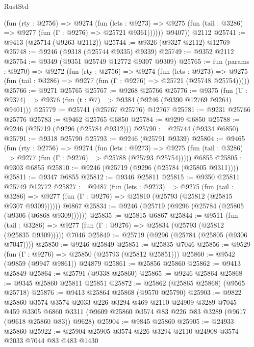 \begin{lexlean}{RustStd}
\begin{coremodule}
            (fun (rty : @2756) =>
            @9274
              (fun (lets : @9273) =>
              @9275 (fun (tail : @3286) => @9277 (fun (Γ : @9276) => @25721 @9361))))))
        @9407))
    @2112
@25741 := @9413 (@25714 (@9263 @2112))
@25744 := @9326 (@9327 @2112) @12769
@25748 := @9246 (@9318 (@25744 @9335) @9339)
@25749 := @9352 @2112
@25754 := @9349 (@9351 @25749 @12772 @9307 @9309)
@25765 := fun (params : @9270) =>
  @9272
    (fun (rty : @2756) =>
    @9274
      (fun (lets : @9273) =>
      @9275 (fun (tail : @3286) => @9277 (fun (Γ : @9276) => @25721 (@25748 @25754)))))
@25766 := @9271 @25765
@25767 := @9268 @25766
@25776 := @9375
    (fun (U : @9374) => @9376 (fun (t : @7) => @9384 (@9246 (@9390 @12769 @9264) @9401)))
@25779 := @25741 (@25767 @25776) @12767
@25781 := @9231 @25766 @25776
@25783 := @9462 @25765 @6850
@25784 := @9299 @6850
@25788 := @9246 (@25719 (@9296 (@25784 @9312)))
@25790 := @25744 (@9334 @6850)
@25791 := @9318 @25790
@25793 := @9246 (@25791 @9339)
@25804 := @9465
    (fun (rty : @2756) =>
    @9274
      (fun (lets : @9273) =>
      @9275 (fun (tail : @3286) => @9277 (fun (Γ : @9276) => @25788 (@25793 @25754)))))
    @6855
@25805 := @9303 @6855
@25810 := @9246 (@25719 (@9296 (@25784 (@25805 @9311))))
@25811 := @9347 @6855
@25812 := @9346 @25811
@25815 := @9350 @25811 @25749 @12772
@25827 := @9487
    (fun (lets : @9273) =>
    @9275
      (fun (tail : @3286) =>
      @9277 (fun (Γ : @9276) => @25810 (@25793 (@25812 (@25815 @9307 @9309))))))
    @6867
@25834 := @9246 (@25719 (@9296 (@25784 (@25805 (@9306 (@6868 @9309))))))
@25835 := @25815 @6867
@25844 := @9511
    (fun (tail : @3286) => @9277 (fun (Γ : @9276) => @25834 (@25793 (@25812 (@25835 @9309)))))
    @7046
@25849 := @25719 (@9296 (@25784 (@25805 (@9306 @7047))))
@25850 := @9246 @25849
@25851 := @25835 @7046
@25856 := @9529 (fun (Γ : @9276) => @25850 (@25793 (@25812 @25851)))
@25860 := @9542 (@9859 (@9947 @9861)) @24879
@25861 := @25856 @25860
@25862 := @9413 @25849
@25864 := @25791 (@9338 @25860)
@25865 := @9246 @25864
@25868 := @9345 @25860 @25811 @25851
@25872 := @25862 (@25865 @25868) (@9565 @25718)
@25876 := @9413 @25864 @25868 (@9570 @25790)
@25903 := @9822
    @25860
    @3574
    @3574
    @2033
    @226
    @3294
    @469
    @2110
    @24909
    @3289
    @7045
    @459
    @3305
    @6860
    @3311
    (@9609 @25860 @3574 @83 @226 @83 @3289 (@9617 (@9618 @25860 @83)) @9628)
@25904 := @9845 @25860
@25905 := @24933 @25860
@25922 := @25904
    @25905
    @3574
    @226
    @3294
    @2110
    @24908
    @3574
    @2033
    @7044
    @83
    @483
    @1430

\end{coremodule}
\end{lexlean}

